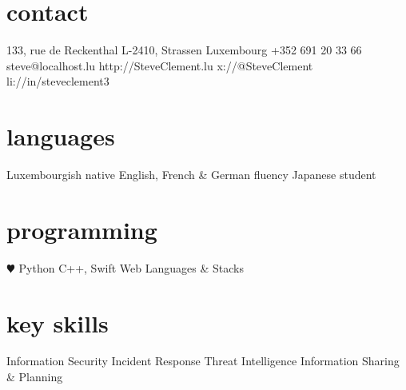 \documentclass[]{friggeri-cv} %
\begin{document}


\begin{aside} %
\section{contact}
133, rue de Reckenthal
L-2410, Strassen
Luxembourg
+352 691 20 33 66
{steve@localhost.lu}
{http://SteveClement.lu}
{x://@SteveClement}
{li://in/steveclement3}
\section{languages}
Luxembourgish native
English, French \& German fluency
Japanese student
\section{programming}
{\color{red} $\varheartsuit$} Python
C++, Swift
Web Languages \& Stacks
\section{key skills}
Information Security
Incident Response
Threat Intelligence
Information Sharing \& Planning
\end{aside}

\end{document}
